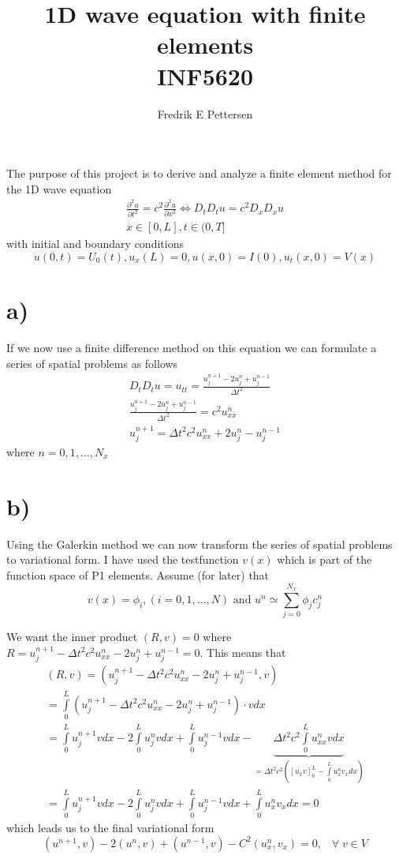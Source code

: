 \documentclass[a4paper,english, 10pt, twoside]{article}
\title{1D wave equation with finite elements\\ INF5620}
\author{Fredrik E Pettersen}
\begin{document}
\maketitle
The purpose of this project is to derive and analyze a finite element method for the 1D wave equation
\begin{align*}
 \frac{\partial^2 u}{\partial t^2} = c^2\frac{\partial^2 u}{\partial x^2} \Leftrightarrow D_tD_tu = c^2D_xD_xu\\
 x\in[0,L], t\in(0,T]
\end{align*}
with initial and boundary conditions
$$
u(0,t) = U_0(t), u_x(L) = 0, u(x,0) = I(0), u_t(x,0) = V(x)
$$

\section*{a)}
If we now use a finite difference method on this equation we can formulate a series of spatial problems as follows
\begin{align*}
 D_tD_tu = u_{tt} = \frac{u_j^{n+1} - 2u_j^n+u_j^{n-1}}{\Delta t^2} \\
 \frac{u_j^{n+1} - 2u_j^n+u_j^{n-1}}{\Delta t^2} = c^2u_{xx}^n \\
 u_j^{n+1} = \Delta t^2c^2u_{xx}^n + 2u_j^n - u_j^{n-1}
\end{align*}
where $n = 0,1,...,N_x$
\section*{b)}
Using the Galerkin method we can now transform the series of spatial problems to variational form. I have used the testfunction $v(x)$ which is 
part of the function space of P1 elements. Assume (for later) that
\begin{equation}\label{approx}
v(x) = \phi_i, (i=0,1,...,N) \text{  and  } u^n \simeq \sum\limits_{j=0}^{N_x} \phi_jc^n_j
\end{equation}

We want the inner product $\left(R,v\right) = 0 $ where $R =  u_j^{n+1} - \Delta t^2c^2u_{xx}^n - 2u_j^n + u_j^{n-1} = 0$. This means that
\begin{align*}
 \left(R,v\right)=  \left(u_j^{n+1} - \Delta t^2c^2u_{xx}^n - 2u_j^n + u_j^{n-1},v\right) \\
 = \int\limits_0^L \left(u_j^{n+1} - \Delta t^2c^2u_{xx}^n - 2u_j^n + u_j^{n-1}\right)\cdot v dx \\
 = \int\limits_0^Lu_j^{n+1}vdx -2\int\limits_0^Lu_j^nvdx + \int\limits_0^Lu_j^{n-1}vdx - \underbrace{\Delta t^2c^2\int\limits_0^Lu_{xx}^nvdx}_{
 = \Delta t^2c^2\left([u_xv]_0^L-\int\limits_0^Lu_x^nv_xdx\right)}\\
 = \int\limits_0^Lu_j^{n+1}vdx -2\int\limits_0^Lu_j^nvdx + \int\limits_0^Lu_j^{n-1}vdx + \int\limits_0^Lu_x^nv_xdx = 0
\end{align*}
which leads us to the final variational form
$$
\left(u^{n+1},v\right) -2 \left(u^n,v\right) + \left(u^{n-1},v\right) - C^2\left(u^n_x,v_x\right) = 0,\;\;\; \forall \;v\in V
$$
\end{document}
